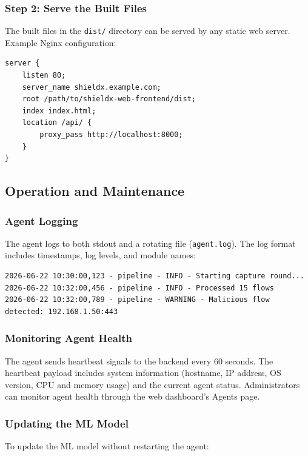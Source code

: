 \documentclass[../Main.tex]{subfiles}
\begin{document}
\subsubsection{Step 2: Serve the Built Files}

The built files in the \texttt{dist/} directory can be served by any static web server. Example Nginx configuration:

\begin{verbatim}
server {
    listen 80;
    server_name shieldx.example.com;
    root /path/to/shieldx-web-frontend/dist;
    index index.html;
    location /api/ {
        proxy_pass http://localhost:8000;
    }
}
\end{verbatim}

\subsection{Operation and Maintenance}

\subsubsection{Agent Logging}

The agent logs to both stdout and a rotating file (\texttt{agent.log}). The log format includes timestamps, log levels, and module names:

\begin{verbatim}
2026-06-22 10:30:00,123 - pipeline - INFO - Starting capture round...
2026-06-22 10:32:00,456 - pipeline - INFO - Processed 15 flows
2026-06-22 10:32:00,789 - pipeline - WARNING - Malicious flow detected: 192.168.1.50:443
\end{verbatim}

\subsubsection{Monitoring Agent Health}

The agent sends heartbeat signals to the backend every 60 seconds. The heartbeat payload includes system information (hostname, IP address, OS version, CPU and memory usage) and the current agent status. Administrators can monitor agent health through the web dashboard's Agents page.

\subsubsection{Updating the ML Model}

To update the ML model without restarting the agent:
\end{document}
